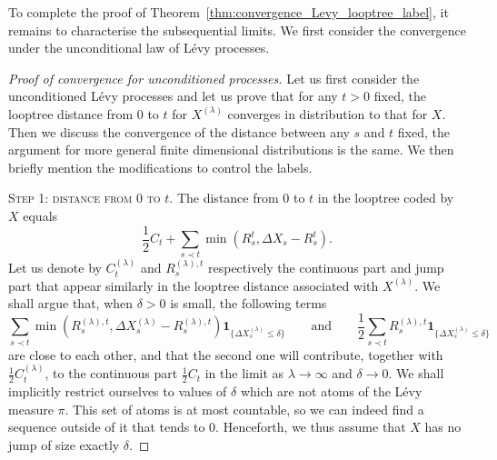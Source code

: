 \documentclass[british, a4paper,11pt]{article}
\numberwithin{equation}{section}
\theoremstyle{definition}
\newcommand{\ind}[1]{\mathbf{1}_{\{#1\}}}
\begin{document}
To complete the proof of Theorem~\ref{thm:convergence_Levy_looptree_label}, it remains to characterise the subsequential limits. We first consider the convergence under the unconditional law of L\'evy processes.


\begin{proof}[Proof of convergence for unconditioned processes]
Let us first consider the unconditioned L\'evy processes and let us prove that for any $t>0$ fixed, the looptree distance from $0$ to $t$ for $X^{(\lambda)}$ converges in distribution to that for $X$. Then we discuss the convergence of the distance between any $s$ and $t$ fixed, the argument for more general finite dimensional distributions is the same. 
We then briefly mention the modifications to control the labels.


\textsc{Step 1: distance from $0$ to $t$.}
The distance from $0$ to $t$ in the looptree coded by $X$ equals
\[\frac{1}{2} C_t + \sum_{s \prec t} \min(R^t_s, \Delta X_s-R^t_s).\]
Let us denote by $C^{(\lambda)}_t$ and $R^{(\lambda), t}_s$ respectively the continuous part and jump part that appear similarly in the looptree distance associated with $X^{(\lambda)}$.
We shall argue that, when $\delta>0$ is small, the following terms
\[\sum_{s \prec t} \min(R^{(\lambda), t}_s, \Delta X^{(\lambda)}_s-R^{(\lambda), t}_s) \ind{\Delta X^{(\lambda)}_s\leq \delta}
\qquad\text{and}\qquad
\frac{1}{2} \sum_{s \prec t} R^{(\lambda), t}_s \ind{\Delta X^{(\lambda)}_s\leq \delta}\]
are close to each other, and that the second one will contribute, together with $\frac{1}{2} C^{(\lambda)}_t$, to the continuous part $\frac{1}{2} C_t$ in the limit as $\lambda\to \infty$ and $\delta \to 0$.
We shall implicitly restrict ourselves to values of $\delta$ which are not atoms of the L\'evy measure $\pi$. This set of atoms is at most countable, so we can indeed find a sequence outside of it that tends to $0$. Henceforth, we thus assume that $X$ has no jump of size exactly $\delta$.



\end{proof}
\end{document}
